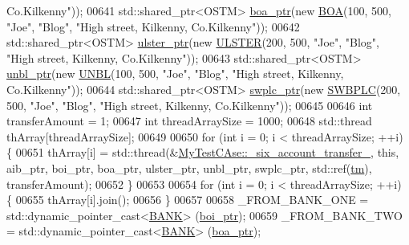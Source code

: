 \begin{DoxyCode}
{       Co.Kilkenny"}));
00641     std::shared\_ptr<OSTM> \hyperlink{class_my_test_c_ase_ae0b2db5d35e25b3139beeda0705494f0_ae0b2db5d35e25b3139beeda0705494f0}{boa\_ptr}(\textcolor{keyword}{new} \hyperlink{class_b_o_a}{BOA}(100, 500, \textcolor{stringliteral}{"Joe"}, \textcolor{stringliteral}{"Blog"}, \textcolor{stringliteral}{"High street, Kilkenny,
       Co.Kilkenny"}));
00642     std::shared\_ptr<OSTM> \hyperlink{class_my_test_c_ase_a4f9f72374d3d15be7cdf16412c4d7ed3_a4f9f72374d3d15be7cdf16412c4d7ed3}{ulster\_ptr}(\textcolor{keyword}{new} \hyperlink{class_u_l_s_t_e_r}{ULSTER}(200, 500, \textcolor{stringliteral}{"Joe"}, \textcolor{stringliteral}{"Blog"}, \textcolor{stringliteral}{"High street,
       Kilkenny, Co.Kilkenny"}));
00643     std::shared\_ptr<OSTM> \hyperlink{class_my_test_c_ase_a0ca634b597d6c0e136d632268853d5a7_a0ca634b597d6c0e136d632268853d5a7}{unbl\_ptr}(\textcolor{keyword}{new} \hyperlink{class_u_n_b_l}{UNBL}(100, 500, \textcolor{stringliteral}{"Joe"}, \textcolor{stringliteral}{"Blog"}, \textcolor{stringliteral}{"High street, Kilkenny,
       Co.Kilkenny"}));
00644     std::shared\_ptr<OSTM> \hyperlink{class_my_test_c_ase_aa8ccae9a5a7feb5bc47591c55a82d0cd_aa8ccae9a5a7feb5bc47591c55a82d0cd}{swplc\_ptr}(\textcolor{keyword}{new} \hyperlink{class_s_w_b_p_l_c}{SWBPLC}(200, 500, \textcolor{stringliteral}{"Joe"}, \textcolor{stringliteral}{"Blog"}, \textcolor{stringliteral}{"High street,
       Kilkenny, Co.Kilkenny"}));
00645     
00646     \textcolor{keywordtype}{int} transferAmount = 1;
00647     \textcolor{keywordtype}{int} threadArraySize = 1000; 
00648     std::thread thArray[threadArraySize];
00649 
00650     \textcolor{keywordflow}{for} (\textcolor{keywordtype}{int} i = 0; i < threadArraySize; ++i) \{
00651         thArray[i] = std::thread(&\hyperlink{class_my_test_c_ase_a72ce436fb3c78c3d76b6c48a5a2e6a76_a72ce436fb3c78c3d76b6c48a5a2e6a76}{MyTestCAse::\_six\_account\_transfer\_}, \textcolor{keyword}{
      this}, aib\_ptr, boi\_ptr, boa\_ptr, ulster\_ptr, unbl\_ptr, swplc\_ptr, std::ref(\hyperlink{class_my_test_c_ase_a422e6e5d4ddedea384be96031c89b72b_a422e6e5d4ddedea384be96031c89b72b}{tm}), transferAmount);
00652     \}
00653     
00654     \textcolor{keywordflow}{for} (\textcolor{keywordtype}{int} i = 0; i < threadArraySize; ++i) \{
00655         thArray[i].join();
00656     \}
00657     
00658     \_FROM\_BANK\_ONE = std::dynamic\_pointer\_cast<\hyperlink{class_b_a_n_k}{BANK}> (\hyperlink{class_my_test_c_ase_a5554de9e3e6393a89c66c036c529720b_a5554de9e3e6393a89c66c036c529720b}{boi\_ptr});
00659     \_FROM\_BANK\_TWO = std::dynamic\_pointer\_cast<\hyperlink{class_b_a_n_k}{BANK}> (\hyperlink{class_my_test_c_ase_ae0b2db5d35e25b3139beeda0705494f0_ae0b2db5d35e25b3139beeda0705494f0}{boa\_ptr});

\end{DoxyCode}
